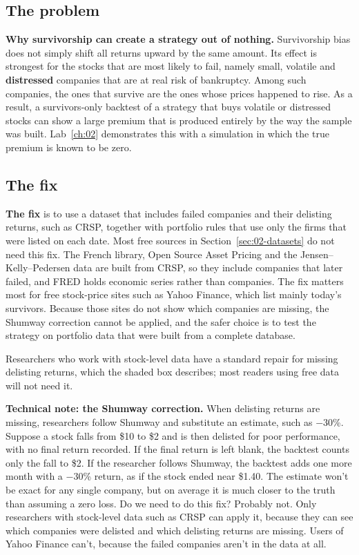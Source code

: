 \subsection{The problem}

\textbf{Why survivorship can create a strategy out of nothing.} Survivorship bias does not simply shift all returns upward by the same amount. Its effect is strongest for the stocks that are most likely to fail, namely small, volatile and \textbf{distressed} companies that are at real risk of bankruptcy. Among such companies, the ones that survive are the ones whose prices happened to rise. As a result, a survivors-only backtest of a strategy that buys volatile or distressed stocks can show a large premium that is produced entirely by the way the sample was built. Lab~\ref{ch:02} demonstrates this with a simulation in which the true premium is known to be zero.

\subsection{The fix}

\textbf{The fix} is to use a dataset that includes failed companies and their delisting returns, such as CRSP, together with portfolio rules that use only the firms that were listed on each date. 
Most free sources in Section~\ref{sec:02-datasets} do not need this fix. The French library, Open Source Asset Pricing and the Jensen--Kelly--Pedersen data are built from CRSP, so they include companies that later failed, and FRED holds economic series rather than companies. The fix matters most for free stock-price sites such as Yahoo Finance, which list mainly today's survivors. Because those sites do not show which companies are missing, the Shumway correction cannot be applied, and the safer choice is to test the strategy on portfolio data that were built from a complete database.

Researchers who work with stock-level data have a standard repair for missing delisting returns, which the shaded box describes; most readers using free data will not need it.

\begin{technote}
\textbf{Technical note: the Shumway correction.} When delisting returns are missing, researchers follow Shumway and substitute an estimate, such as $-30$\%.
Suppose a stock falls from \$10 to \$2 and is then delisted for poor performance, with no final return recorded.
If the final return is left blank, the backtest counts only the fall to \$2.
If the researcher follows Shumway, the backtest adds one more month with a $-30$\% return, as if the stock ended near \$1.40.
The estimate won’t be exact for any single company, but on average it is much closer to the truth than assuming a zero loss.
Do we need to do this fix? Probably not. Only researchers with stock-level data such as CRSP can apply it, because they can see which companies were delisted and which delisting returns are missing. Users of Yahoo Finance can’t, because the failed companies aren’t in the data at all.
\end{technote}


